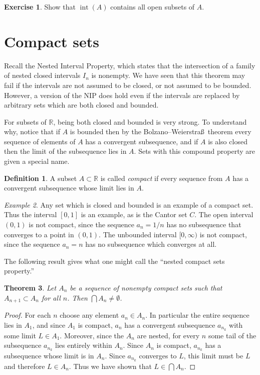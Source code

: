 \documentclass[11pt,oneside]{amsbook}
\newcommand{\R}{\mathbb R}
\DeclareMathOperator{\inte}{int}
\theoremstyle{definition}
\newtheorem{exerc}{Exercise}[section]
\theoremstyle{plain}
\newtheorem{theorem}{Theorem}[section]
\theoremstyle{definition}
\newtheorem{definition}[theorem]{Definition}
\theoremstyle{remark}
\newtheorem{example}[theorem]{Example}
\numberwithin{equation}{section}
\numberwithin{figure}{section}
\begin{document}
\begin{exerc}
  Show that $\inte(A)$ contains all open subsets of $A$.
\end{exerc}


\newpage
\section{Compact sets}

Recall the Nested Interval Property, which states that the intersection of a family of nested closed intervals $I_n$ is nonempty. We have seen that this theorem may fail if the intervals are not assumed to be closed, or not assumed to be bounded. However, a version of the NIP does hold even if the intervals are replaced by arbitrary sets which are both closed and bounded.

For subsets of $\R$, being both closed and bounded is very strong. To understand why, notice that if $A$ is bounded then by the Bolzano--Weierstra\ss\ theorem every sequence of elements of $A$ has a convergent subsequence, and if $A$ is also closed then the limit of the subsequence lies in $A$. Sets with this compound property are given a special name.

\begin{definition}
  A subset $A\subset\R$ is called \emph{compact} if every sequence from $A$ has a convergent subsequence whose limit lies in $A$.
\end{definition}

\begin{example}
  Any set which is closed and bounded is an example of a compact set. Thus the interval $[0,1]$ is an example, as is the Cantor set $C$. The open interval $(0,1)$ is not compact, since the sequence $a_n=1/n$ has no subsequence that converges to a point in $(0,1)$. The unbounded interval $[0,\infty)$ is not compact, since the sequence $a_n=n$ has no subsequence which converges at all.
\end{example}

The following result gives what one might call the ``nested compact sets property.''

\begin{theorem}
  Let $A_n$ be a sequence of nonempty compact sets such that $A_{n+1}\subset A_n$ for all $n$. Then $\bigcap A_n\neq\emptyset$.
\end{theorem}

\begin{proof}
  For each $n$ choose any element $a_n\in A_n$. In particular the entire sequence lies in $A_1$, and since $A_1$ is compact, $a_n$ has a convergent subsequence $a_{n_k}$ with some limit $L\in A_1$. Moreover, since the $A_n$ are nested, for every $n$ some tail of the subsequence $a_{n_k}$ lies entirely within $A_n$. Since $A_n$ is compact, $a_{n_k}$ has a subsequence whose limit is in $A_n$. Since $a_{n_k}$ converges to $L$, this limit must be $L$ and therefore $L\in A_n$. Thus we have shown that $L\in\bigcap A_n$.
\end{proof}
\end{document}
